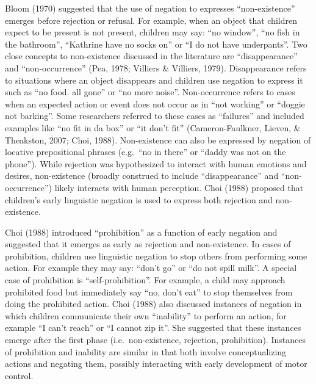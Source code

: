 \documentclass[10pt, letterpaper]{article}
\begin{document}
Bloom (1970) suggested that the use of negation to expresses
``non-existence'' emerges before rejection or refusal. For example, when
an object that children expect to be present is not present, children
may say: ``no window'', ``no fish in the bathroom'', ``Kathrine have no
socks on'' or ``I do not have underpants''. Two close concepts to
non-existence discussed in the literature are ``disappearance'' and
``non-occurrence'' (Pea, 1978; Villiers \& Villiers, 1979).
Disappearance refers to situations where an object disappears and
children use negation to express it such as ``no food. all gone'' or
``no more noise''. Non-occurrence refers to cases when an expected
action or event does not occur as in ``not working'' or ``doggie not
barking''. Some researchers referred to these cases as ``failures'' and
included examples like ``no fit in da box'' or ``it don't fit''
(Cameron-Faulkner, Lieven, \& Theakston, 2007; Choi, 1988).
Non-existence can also be expressed by negation of locative
prepositional phrases (e.g.~``no in there'' or ``daddy was not on the
phone''). While rejection was hypothesized to interact with human
emotions and desires, non-existence (broadly construed to include
``disappearance'' and ``non-occurrence'') likely interacts with human
perception. Choi (1988) proposed that children's early linguistic
negation is used to express both rejection and non-existence.

Choi (1988) introduced ``prohibition'' as a function of early negation
and suggested that it emerges as early as rejection and non-existence.
In cases of prohibition, children use linguistic negation to stop others
from performing some action. For example they may say: ``don't go'' or
``do not spill milk''. A special case of prohibition is
``self-prohibition''. For example, a child may approach prohibited food
but immediately say ``no, don't eat'' to stop themselves from doing the
prohibited action. Choi (1988) also discussed instances of negation in
which children communicate their own ``inability'' to perform an action,
for example ``I can't reach'' or ``I cannot zip it''. She suggested that
these instances emerge after the first phase (i.e.~non-existence,
rejection, prohibition). Instances of prohibition and inability are
similar in that both involve conceptualizing actions and negating them,
possibly interacting with early development of motor control.
\end{document}
